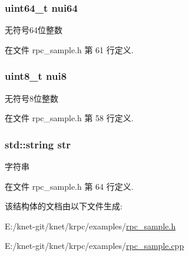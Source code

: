 \hypertarget{structrpc__sample_1_1my__object__t_aa7c0dd5e376ab704bbb9186f7f214f42}{}
\subsubsection[{nui64}]{\setlength{\rightskip}{0pt plus 5cm}uint64\+\_\+t nui64}\label{structrpc__sample_1_1my__object__t_aa7c0dd5e376ab704bbb9186f7f214f42}


无符号64位整数 



在文件 rpc\+\_\+sample.\+h 第 61 行定义.

\hypertarget{structrpc__sample_1_1my__object__t_a46e051ce3e4e6ea30d9680fa779db6d2}{}
\subsubsection[{nui8}]{\setlength{\rightskip}{0pt plus 5cm}uint8\+\_\+t nui8}\label{structrpc__sample_1_1my__object__t_a46e051ce3e4e6ea30d9680fa779db6d2}


无符号8位整数 



在文件 rpc\+\_\+sample.\+h 第 58 行定义.

\hypertarget{structrpc__sample_1_1my__object__t_a5d55e2558544e2ad2ea0b54f8e3d41fc}{}
\subsubsection[{str}]{\setlength{\rightskip}{0pt plus 5cm}std\+::string str}\label{structrpc__sample_1_1my__object__t_a5d55e2558544e2ad2ea0b54f8e3d41fc}


字符串 



在文件 rpc\+\_\+sample.\+h 第 64 行定义.



该结构体的文档由以下文件生成\+:\begin{DoxyCompactItemize}
\item 
E\+:/knet-\/git/knet/krpc/examples/\hyperlink{rpc__sample_8h}{rpc\+\_\+sample.\+h}\item 
E\+:/knet-\/git/knet/krpc/examples/\hyperlink{rpc__sample_8cpp}{rpc\+\_\+sample.\+cpp}\end{DoxyCompactItemize}
